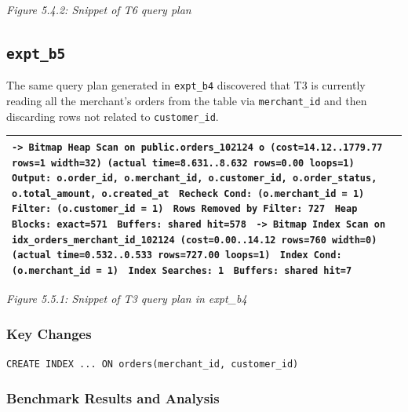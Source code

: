 {\itshape Figure 5.4.2: Snippet of T6 query plan}\par
{}\subsection{\texttt{expt\_\allowbreak{}b5}}
The same query plan generated in \texttt{expt\_\allowbreak{}b4} discovered that T3 is currently reading all the merchant's orders from the table via \texttt{merchant\_\allowbreak{}id} and then discarding rows not related to \texttt{customer\_\allowbreak{}id}.\par
{}
{\fontsize{10.5}{12.5}\selectfont\setlength{\tabcolsep}{2mm}\renewcommand{\arraystretch}{1.15}
\begin{longtable}{>{\raggedright\arraybackslash}p{166.0mm}}\toprule
\texttt{->  Bitmap Heap Scan on public.orders\_\allowbreak{}102124 o  (cost=14.12..1779.77 rows=1 width=32) (actual time=8.631..8.632 rows=0.00 loops=1)} \texttt{      Output: o.order\_\allowbreak{}id, o.merchant\_\allowbreak{}id, o.customer\_\allowbreak{}id, o.order\_\allowbreak{}status, o.total\_\allowbreak{}amount, o.created\_\allowbreak{}at} \texttt{      Recheck Cond: (o.merchant\_\allowbreak{}id = 1)} \texttt{      Filter: (o.customer\_\allowbreak{}id = 1)} \texttt{      Rows Removed by Filter: 727} \texttt{      Heap Blocks: exact=571} \texttt{      Buffers: shared hit=578} \texttt{      ->  Bitmap Index Scan on idx\_\allowbreak{}orders\_\allowbreak{}merchant\_\allowbreak{}id\_\allowbreak{}102124  (cost=0.00..14.12 rows=760 width=0) (actual time=0.532..0.533 rows=727.00 loops=1)} \texttt{            Index Cond: (o.merchant\_\allowbreak{}id = 1)} \texttt{            Index Searches: 1} \texttt{            Buffers: shared hit=7} \\
\midrule\endhead
\bottomrule\end{longtable}}
{\itshape Figure 5.5.1: Snippet of T3 query plan in expt\_b4}\par
{}\subsubsection*{Key Changes}
\texttt{CREATE INDEX ... ON orders(merchant\_\allowbreak{}id, customer\_\allowbreak{}id)}\par
{}\subsubsection*{Benchmark Results and Analysis}
